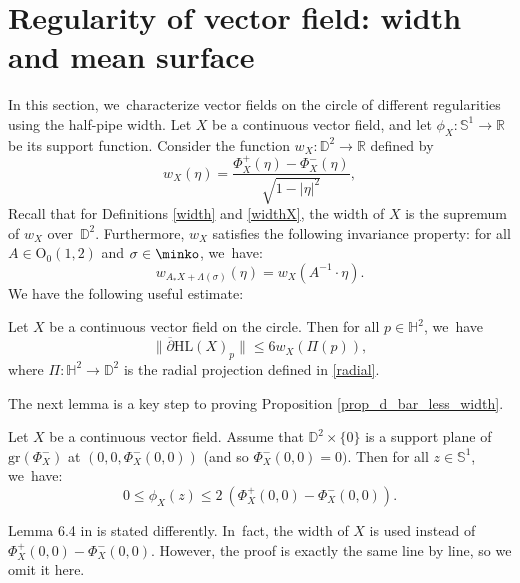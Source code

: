 \section{Regularity of vector field: width and mean surface}\label{sec8_reg}
In this section, we~characterize vector fields on the circle of different regularities using the half-pipe width. Let $X$ be a continuous vector field, and let $\phi_X: \mathbb{S}^1 \to \mathbb{R}$ be its support function. Consider the function $w_X: \mathbb{D}^2 \to \mathbb{R}$ defined by
\begin{equation}\label{w_xz}
w_X(\eta) = \frac{\Phi_X^+(\eta) - \Phi_X^-(\eta)}{\sqrt{1 - \lvert \eta \rvert^2}},
\end{equation}
Recall that for Definitions \ref{width} and \ref{widthX}, the width of $X$ is the supremum of $w_X$ over~$\mathbb{D}^2$. Furthermore, $w_X$ satisfies the following invariance property: for all $A \in \mathrm{O}_0(1,2)$ and $\sigma \in \minko$, we~have:
\begin{equation}\label{eq_width_equivariant}
w_{A_*X+\Lambda(\sigma)}(\eta)=w_{X}(A^{-1}\cdot \eta).
\end{equation}
We have the following useful estimate:
\begin{prop}\label{prop_d_bar_less_width}
Let $X$ be a continuous vector field on the circle. Then for all $p \in \mathbb{H}^2$, we~have
\begin{equation}\label{eqq_d_bar_less_width}
\lVert \overline{\partial}\mathrm{HL}(X)_p \rVert \leq 6 w_X(\Pi(p)),
\end{equation}
where $\Pi: \mathbb{H}^2 \to \mathbb{D}^2$ is the radial projection defined in \eqref{radial}.
\end{prop}

The next lemma is a key step to proving Proposition \ref{prop_d_bar_less_width}.

\begin{lemma}\label{simple_resultt}
Let $X$ be a continuous vector field. Assume that $\mathbb{D}^2 \times \{0\}$ is a support plane of $\mathrm{gr}(\Phi_X^-)$ at $(0, 0, \Phi_X^{-}(0, 0))$ (and so $\Phi^-_X(0, 0) = 0)$. Then for all $z \in \mathbb{S}^1$, we~have:
\begin{equation}\label{eq_phi_less_width}
0\leq\phi_X(z)\leq 2 \ (\Phi_X^+(0,0)-\Phi_X^-(0,0)).
\end{equation}
\end{lemma}

Lemma 6.4 in \cite{diaf2023Infearth} is stated differently. In~fact, the width of \(X \) is used instead of \(\Phi_X^+(0,0) - \Phi_X^-(0,0) \). However, the proof is exactly the same line by line, so we omit it here.

